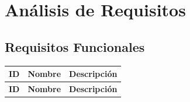 \documentclass[12pt,a4paper]{article}
\begin{document}
\section{An\'alisis de Requisitos}

\subsection{Requisitos Funcionales}

\begin{center}
\begin{longtable}{|C{1.6cm}|L{4cm}|L{8.4cm}|}
\hline
{}
\color{white}\textbf{ID} &
\color{white}\textbf{Nombre} &
\color{white}\textbf{Descripci\'on} \\
\hline
\endfirsthead
\hline
{}
\color{white}\textbf{ID} &
\color{white}\textbf{Nombre} &
\color{white}\textbf{Descripci\'on} \\
\hline
\endhead


\end{longtable}
\end{center}
\end{document}
